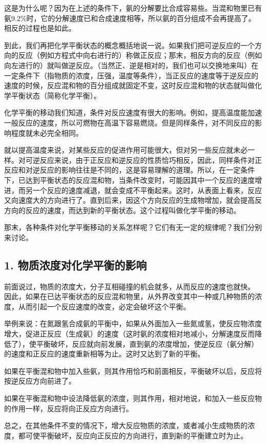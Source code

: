 这是为什么呢？因为在上述的条件下，氨的分解要比合成容易些。当混和物里已有氨9.2\%时，它的分解速度已和合成速度相等，所以氨的百分组成不会再提高了。相反的过程也是如此。

到此，我们再把化学平衡状态的概念概括地说一说。如果我们把可逆反应的一个方向的反应（例如方程式中向右进行的）称做正反应；那末，相反方向的反应（例如向左进行的）就叫做逆反应。（当然正、逆是相对的，我们也可以交换地来叫）在一定条件下（指物质的浓度，压强，温度等条件），当正反应的速度等于逆反应的速度的时候，反应混和物的百分组成就固定不变，这时反应混和物的状态就叫做化学平衡状态（简称化学平衡）。

化学平衡的移动我们知道，条件对反应速度有很大的影响。例如，提高温度能加速一般反应的速度，所以可燃物在高温下容易燃烧。但是同样条件，对不同反应的影响程度就未必完全相同。

就以提高温度来说，对某些反应的促进作用可能很大，但对另一些反应就未必一样。对可逆反应来说，由于正反应和逆反应的性质恰巧相反，因此，同样条件对正反应和对逆反应的影响往往是不同的，这是容易理解的道理。所以，在一定条件下，已达到平衡状态的反应混和物，当条件改变时，可能因其中一个反应的速度增进，而另一个反应的速度减退，就会变成不平衡起来。这时，从表面上看来，反应又向速度大的方向进行了。直到后来，因这个方向反应的生成物增加，就会提高反方向的反应的速度，而达到新的平衡状态。这个过程叫做化学平衡的移动。

那末，各种条件对化学平衡移动的关系怎样呢？它们有无一定的规律呢？我们分别来讨论。

\subsection{1. 物质浓度对化学平衡的影响}

前面说过，物质的浓度大，分子互相碰撞的机会就多，从而反应的速度也就快。
因此，如果在已达平衡状态的反应混和物里，从外界改变其中一种或几种物质的浓度，从而引起一个反应速度的改变，必定会破坏这个平衡。

举例来说：在氮跟氢合成氨的平衡中，如果从外面加入一些氮或氢，使反应物浓度增大，促进正反应（生成氨）的速度（这时氨的浓度相对地减小，分解速度反而降低了），使平衡破坏，反应就向前发展，直到氨的浓度增加，使逆反应（氨分解）的速度和正反应的速度重新相等为止。这时又达到了新的平衡。

如果在平衡混和物中加入些氨，则其作用恰巧和前面相反，平衡破坏以后，反应将按逆反应方向前进了。

如果在平衡混和物中设法降低氨的浓度，则其作用，相对地说，和加入一些反应物的作用一样，反应将向正反应方向进行。

总之，在其他条件不变的情况下，增大反应物质的浓度，或者减小生成物质的浓度，都可使平衡破坏，反应向正反应的方向进行，直到新的平衡建立时为止。

